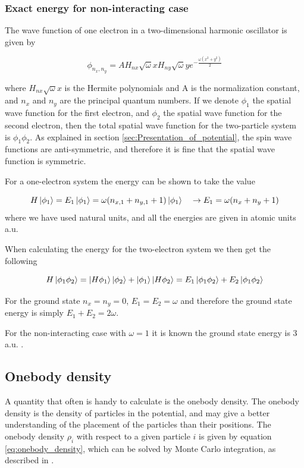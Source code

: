\documentclass[norsk,a4paper,12pt]{article}
\begin{document}
\subsubsection{Exact energy for non-interacting case}

The wave function of one electron in a two-dimensional harmonic oscillator is given by

\begin{equation}
	\label{eq:one_e_wf_ho}
	\phi_{n_x, n_y} = A H_{nx} \sqrt{\omega} x H_{ny} \sqrt{\omega} y e^{-\frac{\omega(x^2 + y^2)}{2}}
\end{equation}

where $H_{nx} \sqrt{\omega} x$ is the Hermite polynomials and A is the normalization constant, and $n_x$ and $n_y$ are the principal quantum numbers. If we denote $\phi_1$ the spatial wave function for the first electron, and $\phi_2$ the spatial wave function for the second electron, then the total spatial wave function for the two-particle system is $\phi_1 \phi_2$. As explained in section \ref{sec:Presentation_of_potential}, the spin wave functions are anti-symmetric, and therefore it is fine that the spatial wave function is symmetric.

For a one-electron system the energy can be shown to take the value 

\begin{equation}
	H \ket{\phi_1} = E_1 \ket{\phi_1} = \omega(n_{x,1} + n_{y,1} + 1) \ket{\phi_1} \quad  \rightarrow E_1 = \omega(n_x + n_y + 1)
\end{equation}
where we have used natural units, and all the energies are given in atomic units a.u.

When calculating the energy for the two-electron system we then get the following

\begin{equation}
	H \ket{\phi_1 \phi_2} = \ket{H \phi_1 } \ket{\phi_2} + \ket{\phi_1} \ket{H \phi_2} = E_1 \ket{\phi_1 \phi_2} + E_2 \ket{\phi_1 \phi_2} 
\end{equation}

For the ground state $n_x = n_y = 0$, $E_1 = E_2 = \omega$ and therefore the ground state energy is simply $E_1 + E_2 = 2\omega$. 

For the non-interacting case with $\omega=1$ it is known the ground state energy is 3 a.u. \cite{Taut}. 

\subsection{Onebody density} \label{sec:onebody}
A quantity that often is handy to calculate is the onebody density. The onebody density is the density of particles in the potential, and may give a better understanding of the placement of the particles than their positions. The onebody density $\rho_i$ with respect to a given particle $i$ is given by equation \ref{eq:onebody_density}, which can be solved by Monte Carlo integration, as described in \cite{Nordhagen}.    
\end{document}
